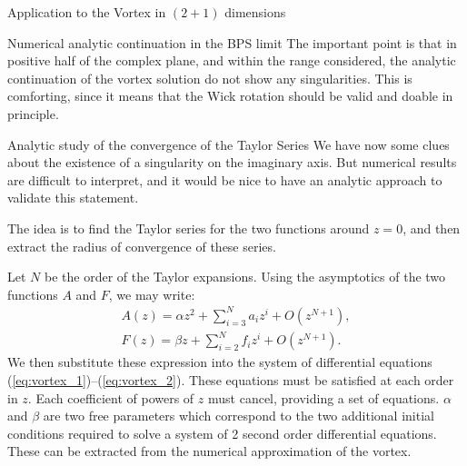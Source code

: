 \begin{section}{Application to the Vortex in $(2+1)$ dimensions}
\begin{subsection}{Numerical analytic continuation in the BPS limit}
    The important point is that in positive half of the complex plane,
    and within the range considered, the analytic continuation of
    the vortex solution do not show any singularities. This is
    comforting, since it means that the Wick rotation should be valid
    and doable in principle.
  \end{subsection}
  \begin{subsection}{Analytic study of the convergence of the Taylor Series}
    We have now some clues about the existence of a singularity on the
    imaginary axis. But numerical results are difficult to interpret,
    and it would be nice to have an analytic approach to validate
    this statement.
    
    The idea is to find the Taylor series for the two functions around
    $z = 0$, and then extract the radius of convergence of these
    series.
    
    Let $N$ be the order of the Taylor expansions. Using the
    asymptotics of the two functions $A$ and $F$, we may write:
    \begin{align}
      A(z) = \alpha z^2 + \sum_{i=3}^N a_iz^i +O(z^{N+1}),\\
      F(z) = \beta z+ \sum_{i=2}^N f_iz^i +O(z^{N+1}).
    \end{align}
    We then substitute these expression into the system of differential
    equations (\ref{eq:vortex_1})--(\ref{eq:vortex_2}). These equations
    must be satisfied at each order in $z$. Each coefficient of powers
    of $z$ must cancel, providing a set of equations. $\alpha$ and
    $\beta$ are two free parameters which correspond to the two
    additional initial conditions required to solve a system of 2 second
    order differential equations. These can be extracted from the
    numerical approximation of the vortex.
    

\end{subsection}
\end{section}

